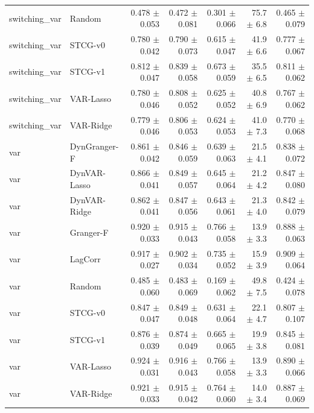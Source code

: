 \begin{tabular}{llrrrrr}
switching_var & Random & 0.478 $\pm$ 0.053 & 0.472 $\pm$ 0.081 & 0.301 $\pm$ 0.066 & 75.7 $\pm$ 6.8 & 0.465 $\pm$ 0.079 \\
switching_var & STCG-v0 & 0.780 $\pm$ 0.042 & 0.790 $\pm$ 0.073 & 0.615 $\pm$ 0.047 & 41.9 $\pm$ 6.6 & 0.777 $\pm$ 0.067 \\
switching_var & STCG-v1 & 0.812 $\pm$ 0.047 & 0.839 $\pm$ 0.058 & 0.673 $\pm$ 0.059 & 35.5 $\pm$ 6.5 & 0.811 $\pm$ 0.062 \\
switching_var & VAR-Lasso & 0.780 $\pm$ 0.046 & 0.808 $\pm$ 0.052 & 0.625 $\pm$ 0.052 & 40.8 $\pm$ 6.9 & 0.767 $\pm$ 0.062 \\
switching_var & VAR-Ridge & 0.779 $\pm$ 0.046 & 0.806 $\pm$ 0.053 & 0.624 $\pm$ 0.053 & 41.0 $\pm$ 7.3 & 0.770 $\pm$ 0.068 \\
var & DynGranger-F & 0.861 $\pm$ 0.042 & 0.846 $\pm$ 0.059 & 0.639 $\pm$ 0.063 & 21.5 $\pm$ 4.1 & 0.838 $\pm$ 0.072 \\
var & DynVAR-Lasso & 0.866 $\pm$ 0.041 & 0.849 $\pm$ 0.057 & 0.645 $\pm$ 0.064 & 21.2 $\pm$ 4.2 & 0.847 $\pm$ 0.080 \\
var & DynVAR-Ridge & 0.862 $\pm$ 0.041 & 0.847 $\pm$ 0.056 & 0.643 $\pm$ 0.061 & 21.3 $\pm$ 4.0 & 0.842 $\pm$ 0.079 \\
var & Granger-F & 0.920 $\pm$ 0.033 & 0.915 $\pm$ 0.043 & 0.766 $\pm$ 0.058 & 13.9 $\pm$ 3.3 & 0.888 $\pm$ 0.063 \\
var & LagCorr & 0.917 $\pm$ 0.027 & 0.902 $\pm$ 0.034 & 0.735 $\pm$ 0.052 & 15.9 $\pm$ 3.9 & 0.909 $\pm$ 0.064 \\
var & Random & 0.485 $\pm$ 0.060 & 0.483 $\pm$ 0.069 & 0.169 $\pm$ 0.062 & 49.8 $\pm$ 7.5 & 0.424 $\pm$ 0.078 \\
var & STCG-v0 & 0.847 $\pm$ 0.047 & 0.849 $\pm$ 0.048 & 0.631 $\pm$ 0.064 & 22.1 $\pm$ 4.7 & 0.807 $\pm$ 0.107 \\
var & STCG-v1 & 0.876 $\pm$ 0.039 & 0.874 $\pm$ 0.049 & 0.665 $\pm$ 0.065 & 19.9 $\pm$ 3.8 & 0.845 $\pm$ 0.081 \\
var & VAR-Lasso & 0.924 $\pm$ 0.031 & 0.916 $\pm$ 0.043 & 0.766 $\pm$ 0.058 & 13.9 $\pm$ 3.3 & 0.890 $\pm$ 0.066 \\
var & VAR-Ridge & 0.921 $\pm$ 0.033 & 0.915 $\pm$ 0.042 & 0.764 $\pm$ 0.060 & 14.0 $\pm$ 3.4 & 0.887 $\pm$ 0.069 \\
\bottomrule
\end{tabular}
